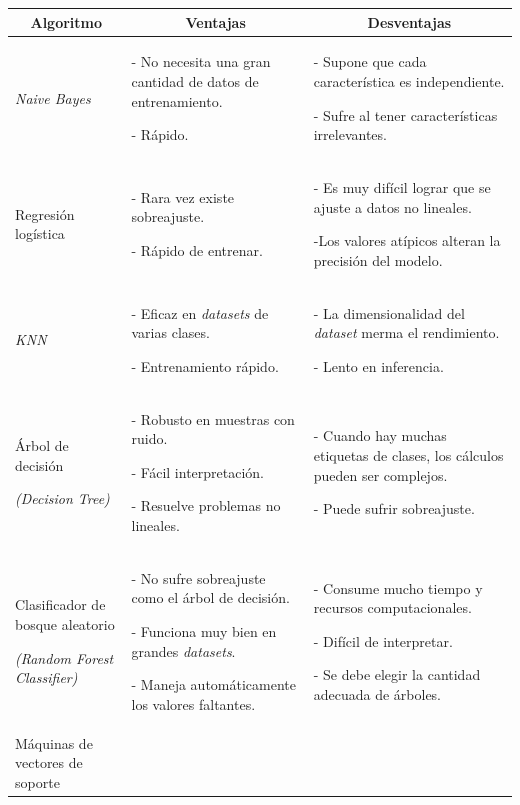 \documentclass[a4paper,12pt]{article}
\begin{document}
\begin{landscape}
	
	\begin{table}[]
		\centering
		\begin{tabularx}{\hsize}{|X|X|X|}
			\hline
			\multicolumn{1}{|c|}{\textbf{Algoritmo}} & \multicolumn{1}{|c|}{\textbf{Ventajas}} & \multicolumn{1}{|c|}{\textbf{Desventajas}} \\
			\hline
			\textit{Naive Bayes}   & 
			- No necesita una gran cantidad de datos de entrenamiento. 
			
			- Rápido. & 
			- Supone que cada característica es independiente. 
			
			- Sufre al tener características irrelevantes.
			\\ \hline
			Regresión logística      & 
			- Rara vez existe sobreajuste. 
			
			- Rápido de entrenar. & 
			- Es muy difícil lograr que se ajuste a datos no lineales. 
			
			-Los valores atípicos alteran la precisión del modelo. 
			
			\\ \hline
			\textit{KNN}           & 
			- Eficaz en \textit{datasets} de varias clases. 
			
			- Entrenamiento rápido. & 
			- La dimensionalidad del \textit{dataset} merma el rendimiento.
			
			- Lento en inferencia. 
			\\ \hline
			Árbol de decisión 
			
			\textit{(Decision Tree)} & 
			- Robusto en muestras con ruido. 
			
			- Fácil interpretación. 
			
			- Resuelve problemas no lineales. & 
			- Cuando hay muchas etiquetas de clases, los cálculos pueden ser complejos. 
			
			- Puede sufrir sobreajuste. 
			\\ \hline
			Clasificador de bosque aleatorio 
			
			\textit{(Random Forest Classifier)} & 
			- No sufre sobreajuste como el árbol de decisión. 
			
			- Funciona muy bien en grandes \textit{datasets}. 
			
			- Maneja automáticamente los valores faltantes. & 
			- Consume mucho tiempo y recursos computacionales.
			
			- Difícil de interpretar.
			
			- Se debe elegir la cantidad adecuada de árboles.
			\\ \hline
			Máquinas de vectores de soporte 
			

\end{tabularx}
\end{table}
\end{landscape}
\end{document}
